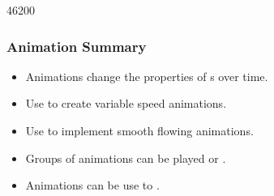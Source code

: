 
\begin{slide}{46200}\frametitle{Animation Summary}

\vspace*{1.5em}
\begin{itemize}
\item Animations change the properties of s over time.
\item Use  to create variable
speed animations.
\item Use  to implement
smooth flowing animations.
\item Groups of animations can be played
or .
\item Animations can be use to .
\end{itemize}
\end{slide}

